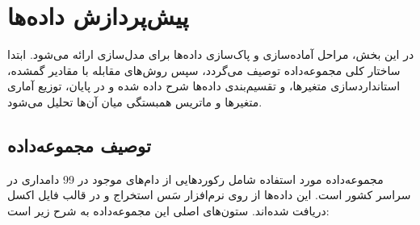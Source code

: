 \section[پیش پردازش داده‌ها]{پیش‌پردازش داده‌ها}

در این بخش، مراحل آماده‌سازی و پاک‌سازی داده‌ها برای مدل‌سازی ارائه می‌شود. ابتدا ساختار کلی مجموعه‌داده توصیف می‌گردد، سپس روش‌های مقابله با مقادیر گمشده، استانداردسازی متغیرها، و تقسیم‌بندی داده‌ها شرح داده شده و در پایان، توزیع آماری متغیرها و ماتریس همبستگی میان آن‌ها تحلیل می‌شود.

\subsection[مجموعه داده]{توصیف مجموعه‌داده}

مجموعه‌داده مورد استفاده شامل رکوردهایی از دام‌های موجود در 99 دامداری‌ در سراسر کشور است. این داده‌ها از روی نرم‌افزار سَس استخراج و در قالب فایل اکسل دریافت شده‌اند. ستون‌های اصلی این مجموعه‌داده به شرح زیر است:


